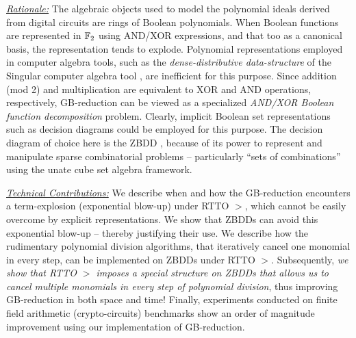 \underline{\it Rationale:} The algebraic objects
used to model the polynomial ideals derived from digital circuits are
rings of Boolean polynomials.
When Boolean functions are represented in ${\mathbb{F}}_2$ using AND/XOR
expressions, and that too as a canonical \Grobner basis, the
representation tends to explode. 
Polynomial representations employed in computer
algebra tools, such as the {\it dense-distributive 
data-structure} of the {\sc Singular} computer algebra tool
\cite{DGPS}, are inefficient for this purpose. Since addition (mod 2) and
multiplication are equivalent to XOR and AND operations,
respectively, GB-reduction can be viewed as a specialized {\it AND/XOR
  Boolean function decomposition} problem. Clearly, implicit Boolean set
representations such as decision diagrams could be employed for this
purpose. The decision diagram of choice here is the ZBDD \cite{zbdd},
because of its power to represent and manipulate sparse combinatorial
problems -- particularly ``sets of combinations'' using the unate cube
set algebra framework. 


\underline{\it Technical Contributions:} %
We describe when and how the GB-reduction encounters a term-explosion
(exponential blow-up) under RTTO $>$, which cannot be easily overcome
by explicit representations. We show that ZBDDs can avoid this
exponential blow-up -- thereby justifying their use. We describe how
the rudimentary polynomial division algorithms, that iteratively
cancel one monomial in every step, can be implemented on ZBDDs under
RTTO $>$. Subsequently, {\it we show that RTTO $>$ imposes a special
structure on ZBDDs that allows us to cancel multiple monomials in
every step of polynomial division}, thus improving GB-reduction in
both space and time! 
Finally, experiments conducted on finite field arithmetic
(crypto-circuits) benchmarks show an order of magnitude improvement
using our implementation of GB-reduction.  

